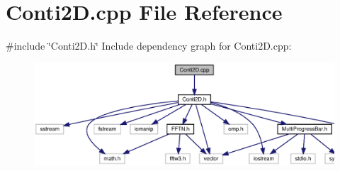 \section{Conti2\+D.\+cpp File Reference}
\label{Conti2D_8cpp}
{\ttfamily \#include \char`\"{}Conti2\+D.\+h\char`\"{}}\newline
Include dependency graph for Conti2\+D.\+cpp\+:\nopagebreak
\begin{figure}[H]
\begin{center}
\leavevmode
\includegraphics[width=350pt]{Conti2D_8cpp__incl}
\end{center}
\end{figure}
